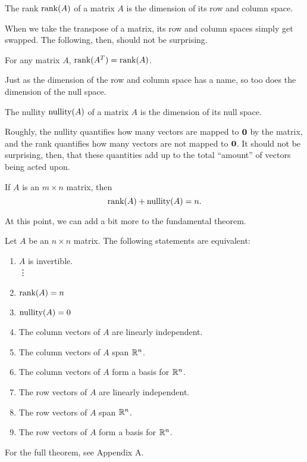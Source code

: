 \documentclass[../m73main.tex]{subfiles}
\begin{document}
\begin{definition}[Rank]
	The rank $\textrm{rank}(A)$ of a matrix $A$ is the dimension of its row and column space.
\end{definition}

When we take the transpose of a matrix, its row and column spaces simply get swapped.
The following, then, should not be surprising.

\begin{theorem}
	For any matrix $A$, $\textrm{rank}(A^T) = \textrm{rank}(A)$.
\end{theorem}

Just as the dimension of the row and column space has a name, so too does the dimension of the null space.

\begin{definition}[Nullity]
	The nullity $\textrm{nullity}(A)$ of a matrix $A$ is the dimension of its null space.
\end{definition}

Roughly, the nullity quantifies how many vectors are mapped to $\mathbf{0}$ by the matrix, and the rank quantifies how many vectors are not mapped to $\mathbf{0}$.
It should not be surprising, then, that these quantities add up to the total ``amount'' of vectors being acted upon.

\begin{theorem}
	If $A$ is an $m\times n$ matrix, then
	\[ \textrm{rank}(A) + \textrm{nullity}(A) = n. \]
\end{theorem}

At this point, we can add a bit more to the fundamental theorem.

\begin{theorem}
	Let $A$ be an $n\times n$ matrix.
	The following statements are equivalent:
	\begin{enumerate}[label=(\alph*)]
		\item $A$ is invertible. \\
		\phantom{~}\hspace{-19.5pt} \vdots
		\setcounter{enumi}{5}		
		\item $\textrm{rank}(A) = n$
		\item $\textrm{nullity}(A) = 0$
		\item The column vectors of $A$ are linearly independent.
		\item The column vectors of $A$ span $\mathbb{R}^n$.
		\item The column vectors of $A$ form a basis for $\mathbb{R}^n$.
		\item The row vectors of $A$ are linearly independent.
		\item The row vectors of $A$ span $\mathbb{R}^n$.
		\item The row vectors of $A$ form a basis for $\mathbb{R}^n$.
	\end{enumerate}
	For the full theorem, see Appendix A.
\end{theorem}
\end{document}
